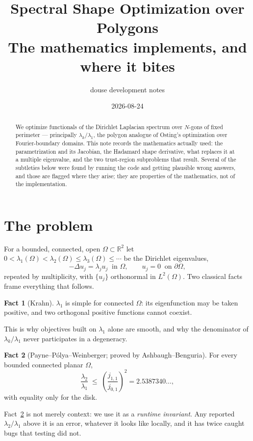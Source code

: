\documentclass[11pt]{article}
\title{Spectral Shape Optimization over Polygons\\
\large The mathematics \code{douse} implements, and where it bites}
\author{douse development notes}
\date{2026-08-24}
\newcommand{\Om}{\Omega}
\newcommand{\bd}{\partial\Omega}
\theoremstyle{definition}
\newtheorem{fact}{Fact}
\begin{document}
\maketitle

\begin{abstract}
We optimize functionals of the Dirichlet Laplacian spectrum over $N$-gons of fixed perimeter ---
principally $\lambda_k/\lambda_1$, the polygon analogue of Osting's optimization over
Fourier-boundary domains. This note records the mathematics actually used: the parametrization
and its Jacobian, the Hadamard shape derivative, what replaces it at a multiple eigenvalue, and
the two trust-region subproblems that result. Several of the subtleties below were found by
running the code and getting plausible wrong answers, and those are flagged where they arise;
they are properties of the mathematics, not of the implementation.
\end{abstract}

\section{The problem}

For a bounded, connected, open $\Om\subset\mathbb{R}^2$ let
$0<\lambda_1(\Om)<\lambda_2(\Om)\le\lambda_3(\Om)\le\cdots$ be the Dirichlet eigenvalues,
\[
  -\Delta u_j=\lambda_j u_j \ \text{ in }\Om,\qquad u_j=0 \ \text{ on }\bd,
\]
repeated by multiplicity, with $\{u_j\}$ orthonormal in $L^2(\Om)$. Two classical facts frame
everything that follows.

\begin{fact}[Krahn]\label{fact:krahn}
$\lambda_1$ is simple for connected $\Om$: its eigenfunction may be taken positive, and two
orthogonal positive functions cannot coexist.
\end{fact}

\noindent This is why objectives built on $\lambda_1$ alone are smooth, and why the denominator
of $\lambda_k/\lambda_1$ never participates in a degeneracy.

\begin{fact}[Payne--P\'olya--Weinberger; proved by Ashbaugh--Benguria]\label{fact:ppw}
For every bounded connected planar $\Om$,
\[
  \frac{\lambda_2}{\lambda_1}\;\le\;\left(\frac{j_{1,1}}{j_{0,1}}\right)^{\!2}=2.5387340\ldots,
\]
with equality only for the disk.
\end{fact}

\noindent Fact~\ref{fact:ppw} is not merely context: we use it as a \emph{runtime invariant}. Any
reported $\lambda_2/\lambda_1$ above it is an error, whatever it looks like locally, and it has
twice caught bugs that testing did not.
\end{document}
